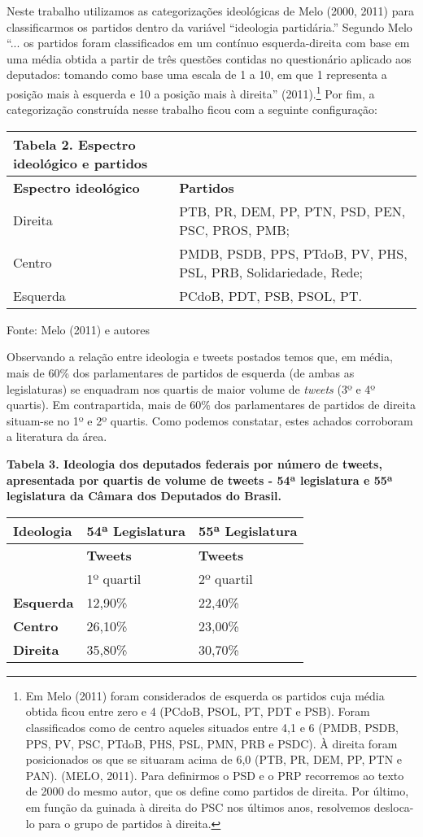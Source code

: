 Neste trabalho utilizamos as categorizações ideológicas de Melo (2000,
2011) para classificarmos os partidos dentro da variável ``ideologia
partidária.'' Segundo Melo ``... os partidos foram classificados em um
contínuo esquerda-direita com base em uma média obtida a partir de três
questões contidas no questionário aplicado aos deputados: tomando como
base uma escala de 1 a 10, em que 1 representa a posição mais à esquerda
e 10 a posição mais à direita'' (2011).\footnote{Em Melo (2011) foram
  considerados de esquerda os partidos cuja média obtida ficou entre
  zero e 4 (PCdoB, PSOL, PT, PDT e PSB). Foram classificados como de
  centro aqueles situados entre 4,1 e 6 (PMDB, PSDB, PPS, PV, PSC,
  PTdoB, PHS, PSL, PMN, PRB e PSDC). À direita foram posicionados os que
  se situaram acima de 6,0 (PTB, PR, DEM, PP, PTN e PAN). (MELO, 2011).
  Para definirmos o PSD e o PRP recorremos ao texto de 2000 do mesmo
  autor, que os define como partidos de direita. Por último, em função
  da guinada à direita do PSC nos últimos anos, resolvemos desloca-lo
  para o grupo de partidos à direita.} Por fim, a categorização
construída nesse trabalho ficou com a seguinte configuração:

\begin{longtable}[]{@{}ll@{}}
\toprule
\textbf{Tabela 2. Espectro ideológico e partidos}\tabularnewline
\midrule
\endhead
\textbf{Espectro ideológico} & \textbf{Partidos}\tabularnewline
Direita & PTB, PR, DEM, PP, PTN, PSD, PEN, PSC, PROS,
PMB;\tabularnewline
Centro & PMDB, PSDB, PPS, PTdoB, PV, PHS, PSL, PRB, Solidariedade,
Rede;\tabularnewline
Esquerda & PCdoB, PDT, PSB, PSOL, PT.\tabularnewline
\bottomrule
\end{longtable}

Fonte: Melo (2011) e autores

Observando a relação entre ideologia e tweets postados temos que, em
média, mais de 60\% dos parlamentares de partidos de esquerda (de ambas
as legislaturas) se enquadram nos quartis de maior volume de
\emph{tweets} (3º e 4º quartis). Em contrapartida, mais de 60\% dos
parlamentares de partidos de direita situam-se no 1º e 2º quartis. Como
podemos constatar, estes achados corroboram a literatura da área.

\textbf{Tabela 3. Ideologia dos deputados federais por número de tweets,
apresentada por quartis de volume de tweets - 54ª legislatura e 55ª
legislatura da Câmara dos Deputados do Brasil.}

\begin{longtable}[]{@{}lll@{}}
\toprule
\textbf{Ideologia} & \textbf{54ª Legislatura} & \textbf{55ª
Legislatura}\tabularnewline
\midrule
\endhead
& \textbf{Tweets} & \textbf{Tweets}\tabularnewline
& 1º quartil & 2º quartil\tabularnewline
\textbf{Esquerda} & 12,90\% & 22,40\%\tabularnewline
\textbf{Centro} & 26,10\% & 23,00\%\tabularnewline
\textbf{Direita} & 35,80\% & 30,70\%\tabularnewline
\bottomrule
\end{longtable}

